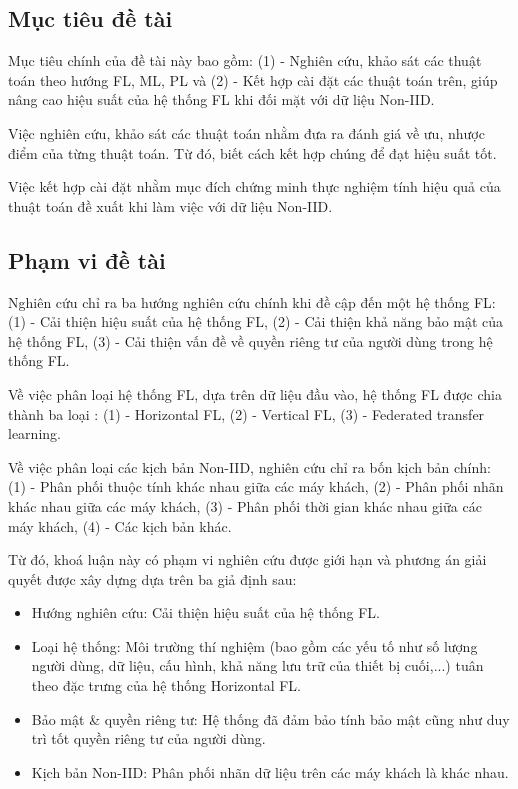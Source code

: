 \documentclass{article}[14pt]
\begin{document}
{    \subsection{Mục tiêu đề tài}

    Mục tiêu chính của đề tài này bao gồm: (1) - Nghiên cứu, khảo sát các thuật toán theo hướng FL, ML, PL và (2) - Kết hợp cài đặt các thuật toán trên, giúp nâng cao hiệu suất của hệ thống FL khi đối mặt với dữ liệu Non-IID.

    Việc nghiên cứu, khảo sát các thuật toán nhằm đưa ra đánh giá về ưu, nhược điểm của từng thuật toán. Từ đó, biết cách kết hợp chúng để đạt hiệu suất tốt.

    Việc kết hợp cài đặt nhằm mục đích chứng minh thực nghiệm tính hiệu quả của thuật toán đề xuất khi làm việc với dữ liệu Non-IID.

    \subsection{Phạm vi đề tài}

    Nghiên cứu \cite{yin2021comprehensive} chỉ ra ba hướng nghiên cứu chính khi đề cập đến một hệ thống FL: (1) - Cải thiện hiệu suất của hệ thống FL, (2) - Cải thiện khả năng bảo mật của hệ thống FL, (3) - Cải thiện vấn đề về quyền riêng tư của người dùng trong hệ thống FL.

    Về việc phân loại hệ thống FL, dựa trên dữ liệu đầu vào, hệ thống FL được chia thành ba loại \cite{yin2021comprehensive}: (1) - Horizontal FL, (2) - Vertical FL, (3) - Federated transfer learning.

    Về việc phân loại các kịch bản Non-IID, nghiên cứu \cite{zhu2021federated} chỉ ra bốn kịch bản chính: (1) - Phân phối thuộc tính khác nhau giữa các máy khách, (2) - Phân phối nhãn khác nhau giữa các máy khách, (3) - Phân phối thời gian khác nhau giữa các máy khách, (4) - Các kịch bản khác.

    Từ đó, khoá luận này có phạm vi nghiên cứu được giới hạn và phương án giải quyết được xây dựng dựa trên ba giả định sau:

    \begin{itemize}
        \item Hướng nghiên cứu: Cải thiện hiệu suất của hệ thống FL.
        \item Loại hệ thống: Môi trường thí nghiệm (bao gồm các yếu tố như số lượng người dùng, dữ liệu, cấu hình, khả năng lưu trữ của thiết bị cuối,...) tuân theo đặc trưng của hệ thống Horizontal FL.
        \item Bảo mật \& quyền riêng tư: Hệ thống đã đảm bảo tính bảo mật cũng như duy trì tốt quyền riêng tư của người dùng.
        \item Kịch bản Non-IID: Phân phối nhãn dữ liệu trên các máy khách là khác nhau.
    \end{itemize}

}
\end{document}
